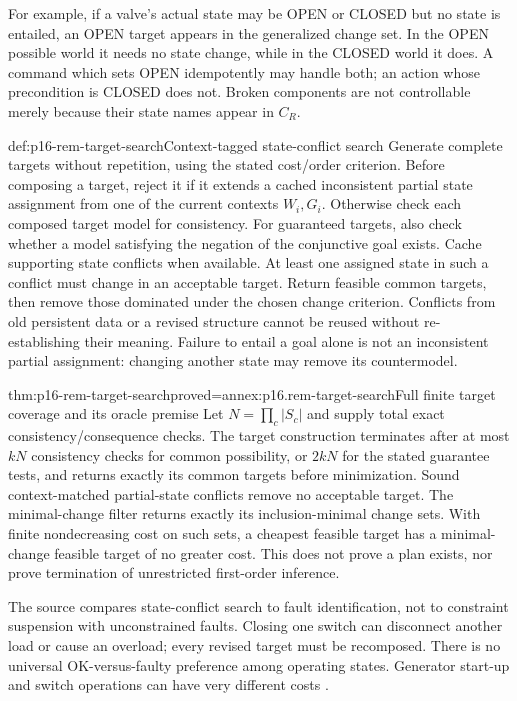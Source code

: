 For example, if a valve's actual state may be OPEN or CLOSED but no state
is entailed, an OPEN target appears in the generalized change set. In the
OPEN possible world it needs no state change, while in the CLOSED world
it does. A command which sets OPEN idempotently may handle both; an action
whose precondition is CLOSED does not. Broken components are not controllable
merely because their state names appear in \(C_R\).

\begin{hbmethod}{def:p16-rem-target-search}{Context-tagged state-conflict search}
Generate complete targets without repetition, using the stated cost/order
criterion. Before composing a target, reject it if it extends a cached
inconsistent partial state assignment from one of the current contexts
\(W_i,G_i\). Otherwise check each composed target model for consistency.
For guaranteed targets, also check whether a model satisfying the negation
of the conjunctive goal exists. Cache supporting state conflicts when
available. At least one assigned state in such a conflict must change
in an acceptable target.
Return feasible common targets, then remove those dominated under the chosen
change criterion. Conflicts from old persistent data or a revised structure
cannot be reused without re-establishing their meaning.
Failure to entail a goal alone is not an inconsistent partial assignment:
changing another state may remove its countermodel.
\end{hbmethod}

\begin{hbtheorem}{thm:p16-rem-target-search}{proved=annex:p16.rem-target-search}{Full finite target coverage and its oracle premise}
Let \(N=\prod_c|S_c|\) and supply total exact consistency/consequence
checks. The target construction terminates after at most \(kN\)
consistency checks for common possibility, or \(2kN\) for the stated
guarantee tests, and returns exactly its common targets before minimization.
Sound context-matched partial-state conflicts remove no acceptable target.
The minimal-change filter returns exactly its inclusion-minimal change sets.
With finite nondecreasing cost on such sets, a cheapest feasible target has
a minimal-change feasible target of no greater cost. This does not prove
a plan exists, nor prove termination of unrestricted first-order inference.
\end{hbtheorem}

The source compares state-conflict search to fault identification, not to
constraint suspension with unconstrained faults. Closing one switch can
disconnect another load or cause an overload; every revised target must
be recomposed. There is no universal OK-versus-faulty preference among
operating states. Generator start-up and switch operations can have very
different costs \cite[pp.~452--453]{Struss2008ModelBasedProblemSolving}.

